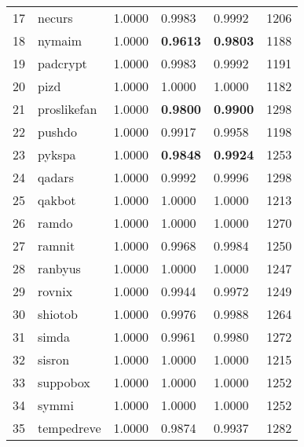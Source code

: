 \begin{table}[!htb]
{\begin{tabular}{l|l|llll}
            17 & necurs       & 1.0000    & 0.9983                     & 0.9992          & 1206    \\
            18 & nymaim       & 1.0000    & \textbf{0.9613}            & \textbf{0.9803} & 1188    \\
            19 & padcrypt     & 1.0000    & 0.9983                     & 0.9992          & 1191    \\
            20 & pizd         & 1.0000    & 1.0000                     & 1.0000          & 1182    \\
            21 & proslikefan  & 1.0000    & \textbf{0.9800}            & \textbf{0.9900} & 1298    \\
            22 & pushdo       & 1.0000    & 0.9917                     & 0.9958          & 1198    \\
            23 & pykspa       & 1.0000    & \textbf{0.9848}            & \textbf{0.9924} & 1253    \\
            24 & qadars       & 1.0000    & 0.9992                     & 0.9996          & 1298    \\
            25 & qakbot       & 1.0000    & 1.0000                     & 1.0000          & 1213    \\
            26 & ramdo        & 1.0000    & 1.0000                     & 1.0000          & 1270    \\
            27 & ramnit       & 1.0000    & 0.9968                     & 0.9984          & 1250    \\
            28 & ranbyus      & 1.0000    & 1.0000                     & 1.0000          & 1247    \\
            29 & rovnix       & 1.0000    & 0.9944                     & 0.9972          & 1249    \\
            30 & shiotob      & 1.0000    & 0.9976                     & 0.9988          & 1264    \\
            31 & simda        & 1.0000    & 0.9961                     & 0.9980          & 1272    \\
            32 & sisron       & 1.0000    & 1.0000                     & 1.0000          & 1215    \\
            33 & suppobox     & 1.0000    & 1.0000                     & 1.0000          & 1252    \\
            34 & symmi        & 1.0000    & 1.0000                     & 1.0000          & 1252    \\
            35 & tempedreve   & 1.0000    & 0.9874                     & 0.9937          & 1282    \\

\end{tabular}}
\end{table}
